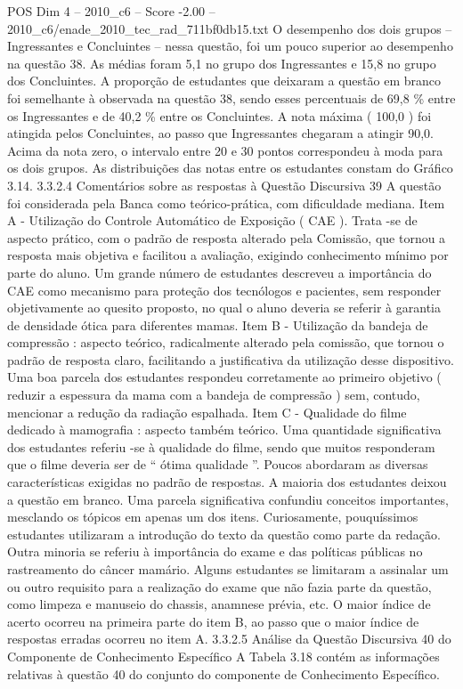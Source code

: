 \begin{textsample}{POS Dim 4 – 2010\_c6 – Score -2.00 – 2010\_c6/enade\_2010\_tec\_rad\_711bf0db15.txt}
O desempenho dos dois grupos – Ingressantes e Concluintes – nessa questão, foi um pouco superior ao desempenho na questão 38.
As médias foram 5,1 no grupo dos Ingressantes e 15,8 no grupo dos Concluintes.
A proporção de estudantes que deixaram a questão em branco foi semelhante à observada na questão 38, sendo esses percentuais de 69,8 \% entre os Ingressantes e de 40,2 \% entre os Concluintes.
A nota máxima ( 100,0 ) foi atingida pelos Concluintes, ao passo que Ingressantes chegaram a atingir 90,0.
Acima da nota zero, o intervalo entre 20 e 30 pontos correspondeu à moda para os dois grupos.
As distribuições das notas entre os estudantes constam do Gráfico 3.14. 3.3.2.4 Comentários sobre as respostas à Questão Discursiva 39 A questão foi considerada pela Banca como teórico-prática, com dificuldade mediana.
Item A - Utilização do Controle Automático de Exposição ( CAE ).
Trata -se de aspecto prático, com o padrão de resposta alterado pela Comissão, que tornou a resposta mais objetiva e facilitou a avaliação, exigindo conhecimento mínimo por parte do aluno.
Um grande número de estudantes descreveu a importância do CAE como mecanismo para proteção dos tecnólogos e pacientes, sem responder objetivamente ao quesito proposto, no qual o aluno deveria se referir à garantia de densidade ótica para diferentes mamas.
Item B - Utilização da bandeja de compressão : aspecto teórico, radicalmente alterado pela comissão, que tornou o padrão de resposta claro, facilitando a justificativa da utilização desse dispositivo.
Uma boa parcela dos estudantes respondeu corretamente ao primeiro objetivo ( reduzir a espessura da mama com a bandeja de compressão ) sem, contudo, mencionar a redução da radiação espalhada.
Item C - Qualidade do filme dedicado à mamografia : aspecto também teórico.
Uma quantidade significativa dos estudantes referiu -se à qualidade do filme, sendo que muitos responderam que o filme deveria ser de “ ótima qualidade ”.
Poucos abordaram as diversas características exigidas no padrão de respostas.
A maioria dos estudantes deixou a questão em branco.
Uma parcela significativa confundiu conceitos importantes, mesclando os tópicos em apenas um dos itens.
Curiosamente, pouquíssimos estudantes utilizaram a introdução do texto da questão como parte da redação.
Outra minoria se referiu à importância do exame e das políticas públicas no rastreamento do câncer mamário.
Alguns estudantes se limitaram a assinalar um ou outro requisito para a realização do exame que não fazia parte da questão, como limpeza e manuseio do chassis, anamnese prévia, etc.
O maior índice de acerto ocorreu na primeira parte do item B, ao passo que o maior índice de respostas erradas ocorreu no item A. 3.3.2.5 Análise da Questão Discursiva 40 do Componente de Conhecimento Específico A Tabela 3.18 contém as informações relativas à questão 40 do conjunto do componente de Conhecimento Específico.

\end{textsample}
